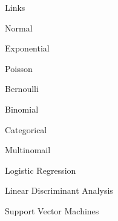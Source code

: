 \documentclass[11pt]{article}
\begin{document}
\begin{enumerate}
\begin{item}
\begin{enumerate}
\begin{item}
\begin{enumerate}
\begin{item}
                  \begin{enumerate}

                      Links

                      \begin{item}
                        Normal
                      \end{item}

                      \begin{item}
                        Exponential
                      \end{item}

                      \begin{item}
                        Poisson
                      \end{item}

                      \begin{item}
                        Bernoulli
                      \end{item}

                      \begin{item}
                        Binomial
                      \end{item}

                      \begin{item}
                        Categorical
                      \end{item}

                      \begin{item}
                        Multinomail
                      \end{item}

                  \end{enumerate}

                \end{item}

                \begin{item}
                  Logistic Regression
                \end{item}

                \begin{item}
                  Linear Discriminant Analysis
                \end{item}

                \begin{item}
                  Support Vector Machines
                \end{item}


\end{enumerate}
\end{item}
\end{enumerate}
\end{item}
\end{enumerate}
\end{document}
